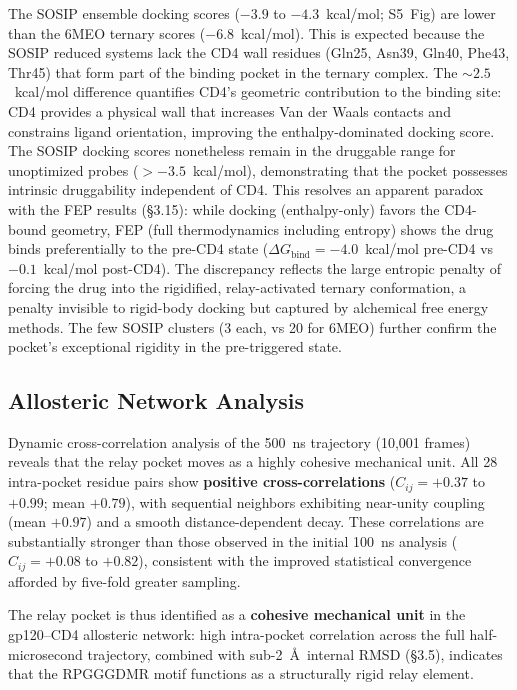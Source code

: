 \documentclass[11pt,a4paper]{article}
\begin{document}
The SOSIP ensemble docking scores ($-3.9$ to $-4.3$~kcal/mol; S5~Fig) are lower than the 6MEO ternary scores ($-6.8$~kcal/mol). This is expected because the SOSIP reduced systems lack the CD4 wall residues (Gln25, Asn39, Gln40, Phe43, Thr45) that form part of the binding pocket in the ternary complex. The ${\sim}2.5$~kcal/mol difference quantifies CD4's geometric contribution to the binding site: CD4 provides a physical wall that increases Van der Waals contacts and constrains ligand orientation, improving the enthalpy-dominated docking score. The SOSIP docking scores nonetheless remain in the druggable range for unoptimized probes ($>-3.5$~kcal/mol), demonstrating that the pocket possesses intrinsic druggability independent of CD4. This resolves an apparent paradox with the FEP results (\S3.15): while docking (enthalpy-only) favors the CD4-bound geometry, FEP (full thermodynamics including entropy) shows the drug binds preferentially to the pre-CD4 state ($\Delta G_\mathrm{bind} = -4.0$~kcal/mol pre-CD4 vs $-0.1$~kcal/mol post-CD4). The discrepancy reflects the large entropic penalty of forcing the drug into the rigidified, relay-activated ternary conformation, a penalty invisible to rigid-body docking but captured by alchemical free energy methods. The few SOSIP clusters (3 each, vs 20 for 6MEO) further confirm the pocket's exceptional rigidity in the pre-triggered state.

\subsection{Allosteric Network Analysis}

Dynamic cross-correlation analysis of the 500~ns trajectory (10,001 frames) reveals that the relay pocket moves as a highly cohesive mechanical unit. All 28 intra-pocket residue pairs show \textbf{positive cross-correlations} ($C_{ij} = +0.37$ to $+0.99$; mean $+0.79$), with sequential neighbors exhibiting near-unity coupling (mean $+0.97$) and a smooth distance-dependent decay. These correlations are substantially stronger than those observed in the initial 100~ns analysis ($C_{ij} = +0.08$ to $+0.82$), consistent with the improved statistical convergence afforded by five-fold greater sampling.

The relay pocket is thus identified as a \textbf{cohesive mechanical unit} in the gp120--CD4 allosteric network: high intra-pocket correlation across the full half-microsecond trajectory, combined with sub-2~\AA\ internal RMSD (\S3.5), indicates that the RPGGGDMR motif functions as a structurally rigid relay element.
\end{document}
